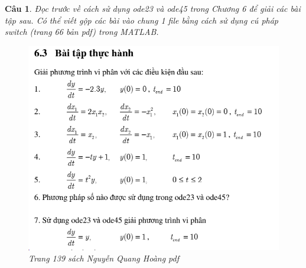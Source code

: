 \documentclass[11pt]{article}
\newtheorem{bt}{Câu}
\begin{document}
\begin{bt}
Đọc trước về cách sử dụng ode23 và ode45 trong Chương 6 để giải các bài tập sau. Có thể viết gộp các bài vào chung 1 file bằng cách sử dụng cú pháp switch (trang 66 bản pdf) trong MATLAB.\\
%	
\begin{figure}[h!]
	\centering
	\includegraphics[width=0.75\linewidth]{K65_4}
	\caption{Trang 139 sách Nguyễn Quang Hoàng pdf}
	\label{fig:k654}
\end{figure}
%
\end{bt}
\end{document}
